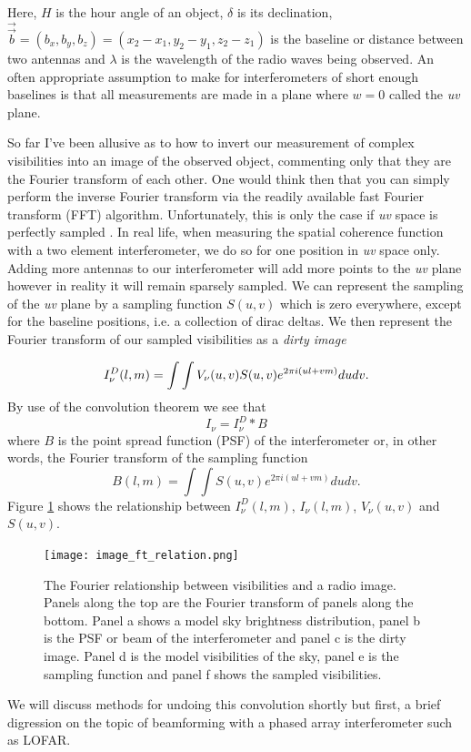 Here, $H$ is the hour angle of an object, $\delta$ is its declination, $\overrightarrow{\Vec{b}} = (b_x, b_y, b_z)=(x_2-x_1,y_2-y_1,z_2-z_1)$ is the baseline or distance between two antennas and $\lambda$ is the wavelength of the radio waves being observed. An often appropriate assumption to make for interferometers of short enough baselines is that all measurements are made in a plane where $w = 0$ called the \textit{uv} plane.

So far I've been allusive as to how to invert our measurement of complex visibilities into an image of the observed object, commenting only that they are the Fourier transform of each other. One would think then that you can simply perform the inverse Fourier transform via the readily available fast Fourier transform (FFT) algorithm. Unfortunately, this is only the case if \textit{uv} space is perfectly sampled . In real life, when measuring the spatial coherence function with a two element interferometer, we do so for one position in \textit{uv} space only. Adding more antennas to our interferometer will add more points to the \textit{uv} plane however in reality it will remain sparsely sampled. We can represent the sampling of the \textit{uv} plane by a sampling function $S(u,v)$ which is zero everywhere, except for the baseline positions, i.e. a collection of dirac deltas. We then represent the Fourier transform of our sampled visibilities as a \textit{dirty image}

\begin{equation}
\label{eq:int_dirtyimage}
I_\nu^D(l, m) = \int \int V_\nu (u,v) S(u,v)e^{2 \pi i (ul + vm)} du dv.\\
\end{equation} 
By use of the convolution theorem we see that 
\begin{equation}
\label{eq:int_convolution}
I_\nu = I_\nu^D \ast B
\end{equation}
where $B$ is the point spread function (PSF) of the interferometer or, in other words, the Fourier transform of the sampling function
\begin{equation}
\label{eq:int_psf}
B(l,m) = \int \int S(u,v) e^{2 \pi i(ul+vm)} du dv.
\end{equation}
Figure \ref{fig:Gary} shows the relationship between $I_\nu^D(l, m)$, $I_\nu(l, m)$,  $V_\nu (u,v)$ and $S(u,v)$.
\begin{figure}[ht]
\texttt{[image: image\_ft\_relation.png]}
\caption[The Fourier relationship between visibilities and a radio image.]{The Fourier relationship between visibilities and a radio image. Panels along the top are the Fourier transform of panels along the bottom. Panel a shows a model sky brightness distribution, panel b is the PSF or beam of the interferometer and panel c is the dirty image. Panel d is the model visibilities of the sky, panel e is the sampling function and panel f shows the sampled visibilities.}
\label{fig:Gary}
\end{figure}
We will discuss methods for undoing this convolution shortly but first, a brief digression on the topic of beamforming with a phased array interferometer such as LOFAR.

